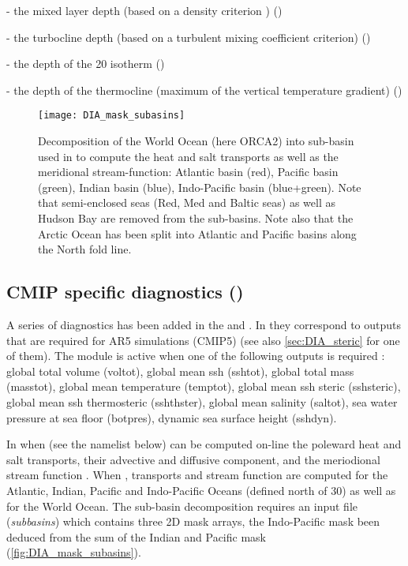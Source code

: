 \documentclass[../main/NEMO_manual]{subfiles}
\begin{document}
- the mixed layer depth (based on a density criterion \citep{de-boyer-montegut.madec.ea_JGR04}) ()

- the turbocline depth (based on a turbulent mixing coefficient criterion) ()

- the depth of the 20 isotherm ()

- the depth of the thermocline (maximum of the vertical temperature gradient) ()

\begin{figure}[!t]
  \centering
  \texttt{[image: DIA\_mask\_subasins]}
  \caption[Decomposition of the World Ocean to compute transports as well as
  the meridional stream-function]{
    Decomposition of the World Ocean (here ORCA2) into sub-basin used in to
    compute the heat and salt transports as well as the meridional stream-function:
    Atlantic basin (red), Pacific basin (green),
    Indian basin (blue), Indo-Pacific basin (blue+green).
    Note that semi-enclosed seas (Red, Med and Baltic seas) as well as
    Hudson Bay are removed from the sub-basins.
    Note also that the Arctic Ocean has been split into Atlantic and
    Pacific basins along the North fold line.
  }
  \label{fig:DIA_mask_subasins}
\end{figure}

\subsection[CMIP specific diagnostics (\textit{diaar5.F90}, \textit{diaptr.F90})]{CMIP specific diagnostics (\protect{})}

A series of diagnostics has been added in the  and .
In  they correspond to outputs that are required for AR5 simulations (CMIP5)
(see also \autoref{sec:DIA_steric} for one of them).
The module  is active when one of the following outputs is required :
global total volume (voltot), global mean ssh (sshtot), global total mass (masstot), global mean temperature (temptot),
global mean ssh steric (sshsteric), global mean ssh thermosteric (sshthster), global mean salinity (saltot),
sea water pressure at sea floor (botpres), dynamic sea surface height (sshdyn).

In  when 
(see the  namelist below) can be computed on-line the poleward heat and salt transports,
their advective and diffusive component, and the meriodional stream function .
When , transports and stream function are computed for the Atlantic, Indian,
Pacific and Indo-Pacific Oceans (defined north of 30) as well as for the World Ocean.
The sub-basin decomposition requires an input file (\textit{subbasins}) which contains three 2D mask arrays,
the Indo-Pacific mask been deduced from the sum of the Indian and Pacific mask (\autoref{fig:DIA_mask_subasins}).
\end{document}

